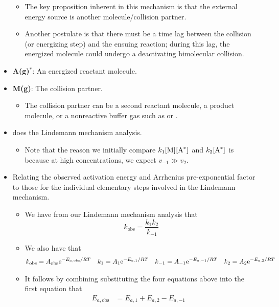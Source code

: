 \documentclass[../notes.tex]{subfiles}
\begin{document}
\begin{itemize}
\begin{itemize}
        \item The key proposition inherent in this mechanism is that the external energy source is another molecule/collision partner.
        \item Another postulate is that there must be a time lag between the collision (or energizing step) and the ensuing reaction; during this lag, the energized molecule could undergo a deactivating bimolecular collision.
    \end{itemize}
    \item \textbf{A(g)${}^{\bm{*}}$}: An energized reactant molecule.
    \item \textbf{M(g)}: The collision partner.
    \begin{itemize}
        \item The collision partner can be a second reactant molecule, a product molecule, or a nonreactive buffer gas such as  or .
    \end{itemize}
    \item \textcite{bib:McQuarrieSimon} does the Lindemann mechanism analysis.
    \begin{itemize}
        \item Note that the reason we initially compare $k_1\cnc{M}\cnc{A^*}$ and $k_2\cnc{A^*}$ is because at high concentrations, we expect $v_{-1}\gg v_2$.
    \end{itemize}
    \item Relating the observed activation energy and Arrhenius pre-exponential factor to those for the individual elementary steps involved in the Lindemann mechanism.
    \begin{itemize}
        \item We have from our Lindemann mechanism analysis that
        \begin{equation*}
            k_\text{obs} = \frac{k_1k_2}{k_{-1}}
        \end{equation*}
        \item We also have that
        \begin{align*}
            k_\text{obs} &= A_\text{obs}\e[-E_{a,\text{obs}}/RT]&
            k_1 &= A_1\e[-E_{a,1}/RT]&
            k_{-1} &= A_{-1}\e[-E_{a,-1}/RT]&
            k_2 &= A_2\e[-E_{a,2}/RT]
        \end{align*}
        \item It follows by combining substituting the four equations above into the first equation that
        \begin{align*}
            E_{a,\text{obs}} &= E_{a,1}+E_{a,2}-E_{a,-1}&

\end{align*}
\end{itemize}
\end{itemize}
\end{document}
